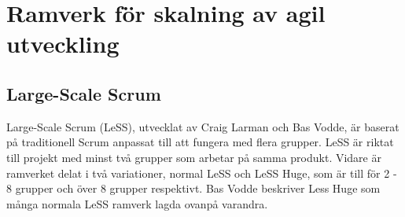	
	
	
	
\newpage
\section{Ramverk för skalning av agil utveckling}
	
	
	\subsection{Large-Scale Scrum}
	
	
		Large-Scale Scrum (LeSS), utvecklat av Craig Larman och Bas Vodde, är baserat på traditionell Scrum anpassat till att fungera med flera grupper. LeSS är riktat till projekt med minst två grupper som arbetar på samma produkt. Vidare är ramverket delat i två variationer, normal LeSS och LeSS Huge, som är till för 2 - 8 grupper och över 8 grupper respektivt. Bas Vodde beskriver Less Huge som många normala LeSS ramverk lagda ovanpå varandra.
		
		
		
			
